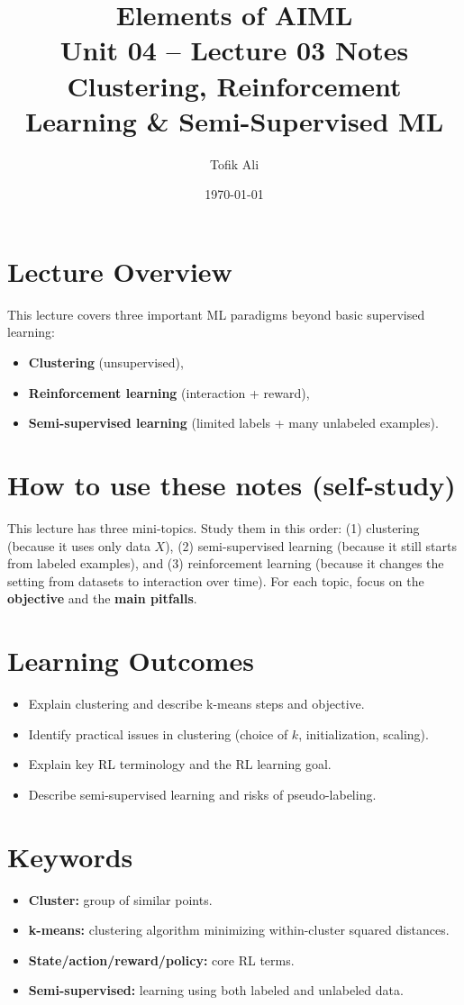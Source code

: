 \documentclass[11pt]{article}
\title{Elements of AIML\\Unit 04 -- Lecture 03 Notes\\Clustering, Reinforcement Learning \& Semi-Supervised ML}
\author{Tofik Ali}
\date{\today}
\begin{document}
\maketitle
\tableofcontents

\section{Lecture Overview}
This lecture covers three important ML paradigms beyond basic supervised learning:
\begin{itemize}[leftmargin=*]
  \item \textbf{Clustering} (unsupervised),
  \item \textbf{Reinforcement learning} (interaction + reward),
  \item \textbf{Semi-supervised learning} (limited labels + many unlabeled examples).
\end{itemize}
\notesources{\AIMLUnitIVSources}

\section{How to use these notes (self-study)}
This lecture has three mini-topics. Study them in this order:
(1) clustering (because it uses only data $X$), (2) semi-supervised learning (because it still starts from labeled examples), and (3) reinforcement learning (because it changes the setting from datasets to interaction over time).
For each topic, focus on the \textbf{objective} and the \textbf{main pitfalls}.

\section{Learning Outcomes}
\begin{itemize}[leftmargin=*]
  \item Explain clustering and describe k-means steps and objective.
  \item Identify practical issues in clustering (choice of $k$, initialization, scaling).
  \item Explain key RL terminology and the RL learning goal.
  \item Describe semi-supervised learning and risks of pseudo-labeling.
\end{itemize}

\section{Keywords}
\begin{itemize}[leftmargin=*]
  \item \textbf{Cluster:} group of similar points.
  \item \textbf{k-means:} clustering algorithm minimizing within-cluster squared distances.
  \item \textbf{State/action/reward/policy:} core RL terms.
  \item \textbf{Semi-supervised:} learning using both labeled and unlabeled data.
\end{itemize}
\end{document}
